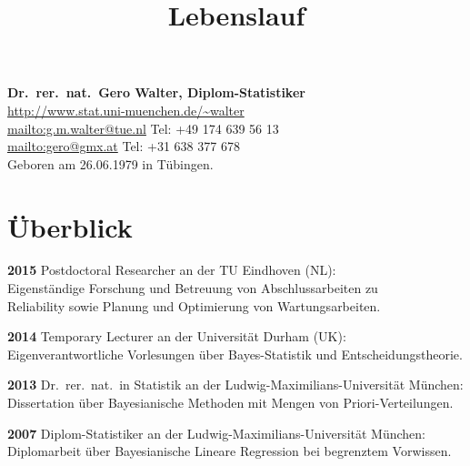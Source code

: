 \documentclass[a4paper]{simplecv}
\begin{document}
\pagestyle{myheadings}




\title{Lebenslauf}


\vspace*{-10ex}
\maketitle

\textbf{\large Dr.\ rer.\ nat.\ Gero Walter, Diplom-Statistiker}\\[2ex]
\url{http://www.stat.uni-muenchen.de/~walter}\\
\url{mailto:g.m.walter@tue.nl} \hfill Tel: +49 174 639 56 13\\
\url{mailto:gero@gmx.at}       \hfill Tel: +31 638 377 678\\

Geboren am 26.06.1979 in T\"{u}bingen.

\section{Überblick}
\begin{topic}
\item[\bfseries 2015] Postdoctoral Researcher an der TU Eindhoven (NL):\\
Eigenständige Forschung und Betreuung von Abschlussarbeiten zu\\ Reliability sowie Planung und Optimierung von Wartungsarbeiten.
\item[\bfseries 2014] Temporary Lecturer an der Universität Durham (UK):\\
Eigenverantwortliche Vorlesungen über Bayes-Statistik und Entscheidungstheorie.
\item[\bfseries 2013] Dr.\ rer.\ nat.\ in Statistik an der Ludwig-Maximilians-Universität München:
Dissertation über Bayesianische Methoden mit Mengen von Priori-Verteilungen.
\item[\bfseries 2007] Diplom-Statistiker an der Ludwig-Maximilians-Universität München:
Diplomarbeit über Bayesianische Lineare Regression bei begrenztem Vorwissen.
\end{topic}
\end{document}
